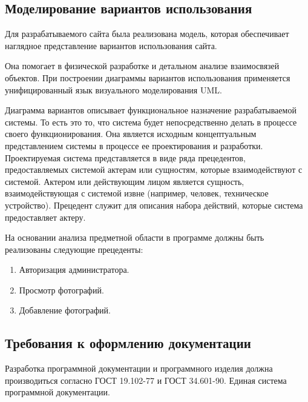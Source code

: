 \subsection{Моделирование вариантов использования}

Для разрабатываемого сайта была реализована модель, которая обеспечивает наглядное представление вариантов использования сайта.

Она помогает в физической разработке и детальном анализе взаимосвязей объектов. При построении диаграммы вариантов использования применяется унифицированный язык визуального моделирования UML.

Диаграмма вариантов описывает функциональное назначение разрабатываемой системы. То есть это то, что система будет непосредственно делать в процессе своего функционирования. Она является исходным концептуальным представлением системы в процессе ее проектирования и разработки. Проектируемая система представляется в виде ряда прецедентов, предоставляемых системой актерам или сущностям, которые взаимодействуют с системой. Актером или действующим лицом является сущность, взаимодействующая с системой извне (например, человек, техническое устройство). Прецедент служит для описания набора действий, которые система предоставляет актеру.

На основании анализа предметной области в программе должны быть реализованы следующие прецеденты:
\begin{enumerate}
\item Авторизация администратора.
\item Просмотр фотографий.
\item Добавление фотографий.
\end{enumerate}

\subsection{Требования к оформлению документации}

Разработка программной документации и программного изделия должна производиться согласно ГОСТ 19.102-77 и ГОСТ 34.601-90. Единая система программной документации.
